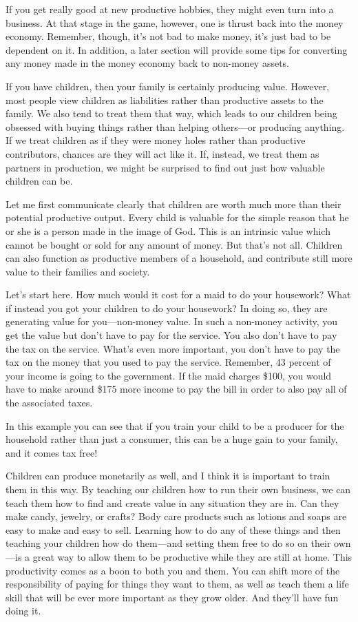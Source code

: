 If you get really good at new productive hobbies, they might even turn
into a business. At that stage in the game, however, one is thrust back
into the money economy.  Remember, though, it's not
bad to make money, it's just bad to be dependent on
it.  In addition, a later section will provide some tips for converting
any money made in the money economy back to non-money assets. 

If you have children, then your family is certainly producing value.
However, most people view children as liabilities rather than
productive assets to the family. We also tend to treat them that way,
which leads to our children being obsessed with buying things rather
than helping others—or
producing anything. If we treat
children as if they
were money holes rather than productive contributors, chances are they
will act like it. If, instead, we treat them as partners in production,
we might be surprised to find out just how valuable children can be. 

Let me first
communicate clearly that children are worth
much more than their
potential productive output. Every child is valuable for the simple
reason that he or she is a person made in the image of God.  This is an
intrinsic value which cannot be bought or sold for any amount of money.
 But that's not all.  Children can also function as
productive members of a  household, and contribute still more value to
their families and society.

Let’s start here. How
much would it cost for a maid to do your housework?  What if
instead you got your
children to do your housework?  In doing so, they are generating value
for you—non-money value. In such a non-money activity, you get the
value but don’t have to pay for the service. You also don’t have to pay
the tax on the service.
What’s even more
important, you don’t have to pay the tax on the money that you used to
pay the service. Remember, 43 percent of your income is going to the
government. If the maid charges \$100, you would have to make around
\$175 more income to pay the bill in order to also pay all of the
associated taxes.

In this example you
can see that if you train your child to be a producer for the household
rather than just a consumer, this can be a huge gain to your family,
and it comes tax free!

Children can produce monetarily as well, and I think it is important to
train them in this way. By teaching our children how to run their own
business, we can teach them how to find and create value in any
situation they are in. Can they make candy, jewelry, or crafts?  Body
care products such as lotions and soaps are easy to make and easy to
sell. Learning how to
do any of these things and then teaching your children how do them—and
setting them free to do so on their own—is a great way to allow them
to be productive while they are still
at home. This
productivity comes as a boon to both you and them. You can shift more
of the responsibility of paying for things they want to them, as well
as teach them a life skill that will be ever more important as they
grow older. And
they’ll have fun doing it.

